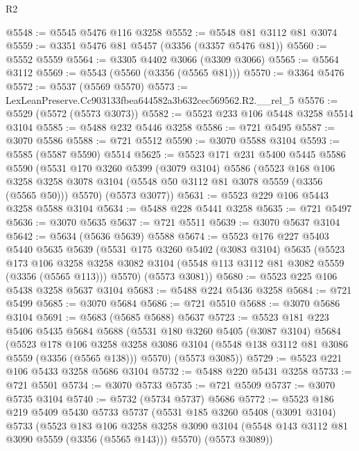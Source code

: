 \begin{lexlean}{R2}
\begin{coremodule}
@5548 := @5545 @5476 @116 @3258
@5552 := @5548 @81 @3112 @81 @3074
@5559 := @3351 @5476 @81 @5457 (@3356 (@3357 @5476 @81))
@5560 := @5552 @5559
@5564 := @3305 @4402 @3066 (@3309 @3066)
@5565 := @5564 @3112
@5569 := @5543 (@5560 (@3356 (@5565 @81)))
@5570 := @3364 @5476
@5572 := @5537 (@5569 @5570)
@5573 := LexLeanPreserve.Cc903133fbea644582a3b632cec569562.R2.__rel_5
@5576 := @5529 (@5572 (@5573 @3073))
@5582 := @5523 @233 @106 @5448 @3258 @5514 @3104
@5585 := @5488 @232 @5446 @3258
@5586 := @721 @5495
@5587 := @3070 @5586
@5588 := @721 @5512
@5590 := @3070 @5588 @3104
@5593 := @5585 (@5587 @5590) @5514
@5625 := @5523
    @171
    @231
    @5400
    @5445
    @5586
    @5590
    (@5531
      @170
      @3260
      @5399
      (@3079 @3104)
      @5586
      (@5523
        @168
        @106
        @3258
        @3258
        @3078
        @3104
        (@5548 @50 @3112 @81 @3078 @5559 (@3356 (@5565 @50)))
        @5570)
      (@5573 @3077))
@5631 := @5523 @229 @106 @5443 @3258 @5588 @3104
@5634 := @5488 @228 @5441 @3258
@5635 := @721 @5497
@5636 := @3070 @5635
@5637 := @721 @5511
@5639 := @3070 @5637 @3104
@5642 := @5634 (@5636 @5639) @5588
@5674 := @5523
    @176
    @227
    @5403
    @5440
    @5635
    @5639
    (@5531
      @175
      @3260
      @5402
      (@3083 @3104)
      @5635
      (@5523
        @173
        @106
        @3258
        @3258
        @3082
        @3104
        (@5548 @113 @3112 @81 @3082 @5559 (@3356 (@5565 @113)))
        @5570)
      (@5573 @3081))
@5680 := @5523 @225 @106 @5438 @3258 @5637 @3104
@5683 := @5488 @224 @5436 @3258
@5684 := @721 @5499
@5685 := @3070 @5684
@5686 := @721 @5510
@5688 := @3070 @5686 @3104
@5691 := @5683 (@5685 @5688) @5637
@5723 := @5523
    @181
    @223
    @5406
    @5435
    @5684
    @5688
    (@5531
      @180
      @3260
      @5405
      (@3087 @3104)
      @5684
      (@5523
        @178
        @106
        @3258
        @3258
        @3086
        @3104
        (@5548 @138 @3112 @81 @3086 @5559 (@3356 (@5565 @138)))
        @5570)
      (@5573 @3085))
@5729 := @5523 @221 @106 @5433 @3258 @5686 @3104
@5732 := @5488 @220 @5431 @3258
@5733 := @721 @5501
@5734 := @3070 @5733
@5735 := @721 @5509
@5737 := @3070 @5735 @3104
@5740 := @5732 (@5734 @5737) @5686
@5772 := @5523
    @186
    @219
    @5409
    @5430
    @5733
    @5737
    (@5531
      @185
      @3260
      @5408
      (@3091 @3104)
      @5733
      (@5523
        @183
        @106
        @3258
        @3258
        @3090
        @3104
        (@5548 @143 @3112 @81 @3090 @5559 (@3356 (@5565 @143)))
        @5570)
      (@5573 @3089))

\end{coremodule}
\end{lexlean}
